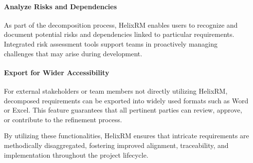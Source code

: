 \paragraph{Analyze Risks and Dependencies}
As part of the decomposition process, HelixRM enables users to recognize and document potential risks and dependencies linked to particular requirements.
Integrated risk assessment tools support teams in proactively managing challenges that may arise during development.

\paragraph{Export for Wider Accessibility}
For external stakeholders or team members not directly utilizing HelixRM, decomposed requirements can be exported into widely used formats such as Word or Excel.
This feature guarantees that all pertinent parties can review, approve, or contribute to the refinement process.

By utilizing these functionalities, HelixRM ensures that intricate requirements are methodically disaggregated, fostering improved alignment, traceability, and implementation throughout the project lifecycle.
